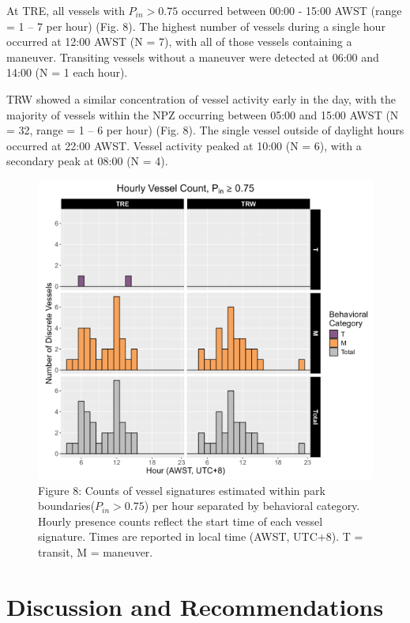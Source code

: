 \documentclass[
  letterpaper,
  oneside,
  open=any]{scrbook}
\begin{document}
At TRE, all vessels with \(P_{in} > 0.75\) occurred between 00:00 -
15:00 AWST (range = 1 -- 7 per hour) (Fig. 8). The highest number of
vessels during a single hour occurred at 12:00 AWST (N = 7), with all of
those vessels containing a maneuver. Transiting vessels without a
maneuver were detected at 06:00 and 14:00 (N = 1 each hour).

TRW showed a similar concentration of vessel activity early in the day,
with the majority of vessels within the NPZ occurring between 05:00 and
15:00 AWST (N = 32, range = 1 -- 6 per hour) (Fig. 8). The single vessel
outside of daylight hours occurred at 22:00 AWST. Vessel activity peaked
at 10:00 (N = 6), with a secondary peak at 08:00 (N = 4).

\begin{figure}[H]

{\centering \includegraphics{images/Figure.8.PNG}

}

\caption{Figure 8: Counts of vessel signatures estimated within park
boundaries(\(P_{in} > 0.75\)) per hour separated by behavioral category.
Hourly presence counts reflect the start time of each vessel signature.
Times are reported in local time (AWST, UTC+8). T = transit, M =
maneuver.}

\end{figure}%


\chapter{Discussion and
Recommendations}\label{discussion-and-recommendations}
\end{document}
